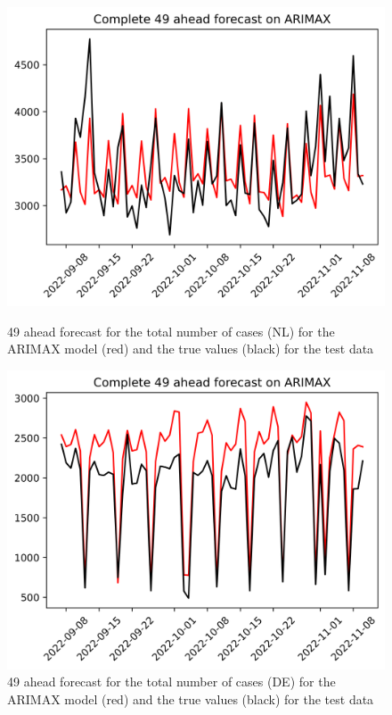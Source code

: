 \begin{figure}

\begin{minipage}{.45\textwidth}
  \centering
  \includegraphics[width=\linewidth]{pics/49_ah/Complete_49_ahead_ARIMAX.png}
  \caption{49 ahead forecast for the total number of cases (NL) for the ARIMAX model (red) and the true values (black) for the test data}
  \label{fig:tot_cases_fc_49_ARIMAX}
\end{minipage}
\begin{minipage}{.45\textwidth}
  \centering
  \includegraphics[width=\linewidth]{pics/49_ah/DE_Complete_49_ahead_ARIMAX.png}
  \caption{49 ahead forecast for the total number of cases (DE) for the ARIMAX model (red) and the true values (black) for the test data}
  \label{fig:tot_cases_fc_49_ARIMAX_DE}
\end{minipage}

\end{figure}

